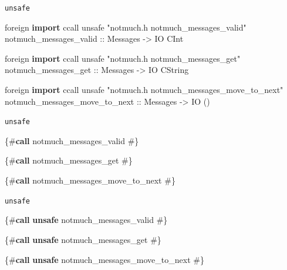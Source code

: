 \documentclass[ignorenonframetext,aspectratio=169]{beamer}
\newenvironment{Shaded}{}{}
\newcommand{\KeywordTok}[1]{\textcolor[rgb]{0.00,0.44,0.13}{\textbf{{#1}}}}
\newcommand{\DataTypeTok}[1]{\textcolor[rgb]{0.56,0.13,0.00}{{#1}}}
\newcommand{\StringTok}[1]{\textcolor[rgb]{0.25,0.44,0.63}{{#1}}}
\newcommand{\OtherTok}[1]{\textcolor[rgb]{0.00,0.44,0.13}{{#1}}}
\newcommand{\NormalTok}[1]{{#1}}
\begin{document}
\begin{frame}[fragile]{\texttt{unsafe}}

\begin{Shaded}
\begin{Highlighting}[]
\NormalTok{foreign }\KeywordTok{import }\NormalTok{ccall unsafe "notmuch.h notmuch_messages_valid"}
\OtherTok{  notmuch_messages_valid ::} \DataTypeTok{Messages} \OtherTok{->} \DataTypeTok{IO} \DataTypeTok{CInt}

\NormalTok{foreign }\KeywordTok{import }\NormalTok{ccall unsafe "notmuch.h notmuch_messages_get"}
\OtherTok{  notmuch_messages_get ::} \DataTypeTok{Messages} \OtherTok{->} \DataTypeTok{IO} \DataTypeTok{CString}

\NormalTok{foreign }\KeywordTok{import }\NormalTok{ccall unsafe "notmuch.h notmuch_messages_move_to_next"}
\OtherTok{  notmuch_messages_move_to_next ::} \DataTypeTok{Messages} \OtherTok{->} \DataTypeTok{IO} \NormalTok{()}
\end{Highlighting}
\end{Shaded}

\end{frame}

\begin{frame}[fragile]{\texttt{unsafe}}

\begin{Shaded}
\begin{Highlighting}[]
\StringTok{\{#}\KeywordTok{call}\StringTok{        notmuch_messages_valid #\}}

\StringTok{\{#}\KeywordTok{call}\StringTok{        notmuch_messages_get #\}}

\StringTok{\{#}\KeywordTok{call}\StringTok{        notmuch_messages_move_to_next #\}}
\end{Highlighting}
\end{Shaded}

\end{frame}

\begin{frame}[fragile]{\texttt{unsafe}}

\begin{Shaded}
\begin{Highlighting}[]
\StringTok{\{#}\KeywordTok{call}\StringTok{ }\KeywordTok{unsafe}\StringTok{ notmuch_messages_valid #\}}

\StringTok{\{#}\KeywordTok{call}\StringTok{ }\KeywordTok{unsafe}\StringTok{ notmuch_messages_get #\}}

\StringTok{\{#}\KeywordTok{call}\StringTok{ }\KeywordTok{unsafe}\StringTok{ notmuch_messages_move_to_next #\}}
\end{Highlighting}
\end{Shaded}

\end{frame}
\end{document}
